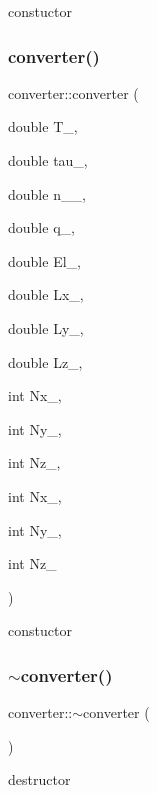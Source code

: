 constuctor 

\mbox{\label{classconverter_ab0baf1f442a7119d458300f0d15ad526}} 
\subsubsection{\texorpdfstring{converter()}{converter()}\hspace{0.1cm}{\footnotesize\ttfamily [2/2]}}
{\footnotesize\ttfamily converter\+::converter (\begin{DoxyParamCaption}\item[{double}]{T\+\_\+,  }\item[{double}]{tau\+\_\+,  }\item[{double}]{n\+\_\+\_\+,  }\item[{double}]{q\+\_\+,  }\item[{double}]{El\+\_\+,  }\item[{double}]{Lx\+\_\+,  }\item[{double}]{Ly\+\_\+,  }\item[{double}]{Lz\+\_\+,  }\item[{int}]{Nx\+\_\+,  }\item[{int}]{Ny\+\_\+,  }\item[{int}]{Nz\+\_\+,  }\item[{int}]{Nx\+\_,  }\item[{int}]{Ny\+\_,  }\item[{int}]{Nz\+\_ }\end{DoxyParamCaption})}



constuctor 

\mbox{\label{classconverter_ad8feb2580c06b85cc60f643cc36c47ab}} 
\subsubsection{\texorpdfstring{$\sim$converter()}{~converter()}}
{\footnotesize\ttfamily converter\+::$\sim$converter (\begin{DoxyParamCaption}{ }\end{DoxyParamCaption})}



destructor 



